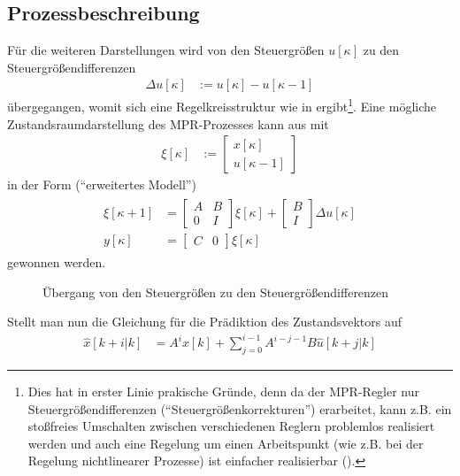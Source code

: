 \subsection{Prozessbeschreibung}
Für die weiteren Darstellungen wird von den Steuergrößen $u[\kappa]$ zu den Steuergrößendifferenzen
\begin{align}
	\Delta u[\kappa] & := u[\kappa]-u[\kappa -1]
\end{align}
übergegangen, womit sich eine Regelkreisstruktur wie in  ergibt\footnote{Dies hat in erster Linie prakische Gründe, denn da der
\ac{MPR}-Regler nur Steuergrößendifferenzen ("`Steuergrößenkorrekturen"') erarbeitet, kann z.B. ein stoßfreies Umschalten zwischen verschiedenen Reglern problemlos realisiert werden und auch eine Regelung um einen Arbeitspunkt
(wie z.B. bei der Regelung nichtlinearer Prozesse) ist einfacher realisierbar (\cite{Maciejowski2002}).}. Eine mögliche Zustandsraumdarstellung des
\ac{MPR}-Prozesses kann aus  mit
\begin{align}
	\xi[\kappa] & := \begin{bmatrix}
	x[\kappa]\\ u[\kappa -1]
	\end{bmatrix}
\end{align}
in der Form ("`erweitertes Modell"')
\begin{align}
\begin{split}\label{eqn:kap_4_erweitertes_modell}
	\xi[\kappa+1] & = \begin{bmatrix}
	A & B\\ 0 & I
	\end{bmatrix}\xi[\kappa]+\begin{bmatrix}
	B\\ I
	\end{bmatrix}\Delta u[\kappa]\\
	y[\kappa] & = \begin{bmatrix}
	C & 0
	\end{bmatrix}\xi[\kappa]
\end{split}
\end{align}
gewonnen werden.
\begin{figure}[htb]
	\centering
	
	\caption{Übergang von den Steuergrößen zu den Steuergrößendifferenzen}
	\label{fig:kap_4_steuergroessen_differenzen}
\end{figure}
Stellt man nun die Gleichung für die Prädiktion des Zustandsvektors auf
\begin{align}
	\hat{x}[k+i|k] & = A^ix[k]+\sum\limits_{j=0}^{i-1}A^{i-j-1}B\hat{u}[k+j|k]
\end{align}
